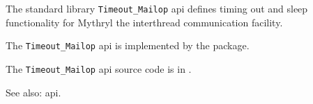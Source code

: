
The standard library {\tt Timeout\_Mailop} api defines timing out and sleep functionality for Mythryl the interthread communication facility.

The {\tt Timeout\_Mailop} api is implemented by the  package.

The {\tt Timeout\_Mailop} api source code is in .

See also:  api.



